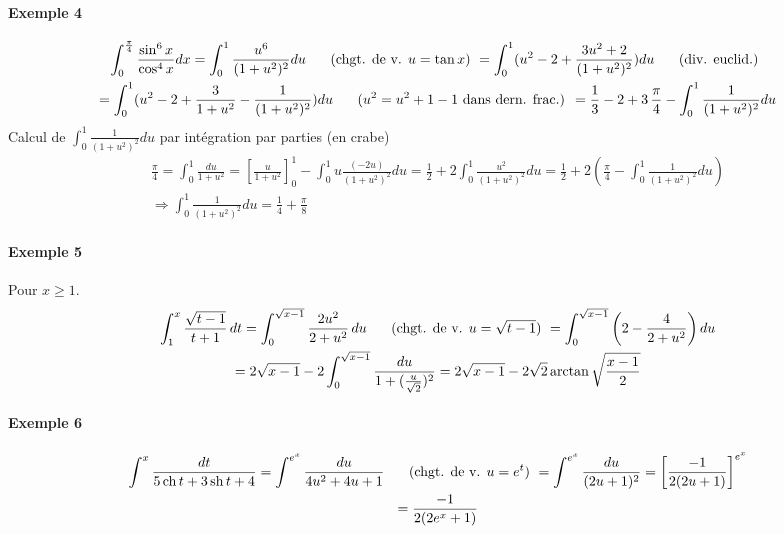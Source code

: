 \paragraph{Exemple 4}
\begin{multline*}
 \int_{0}^{\frac{\pi}{4}}\frac{\sin^6x}{\cos^4x}dx
=\int_0^1\frac{u^6}{(1+u^2)^2}du \hspace{0.5cm}\text{ (chgt. de v. $u=\tan x$) }
=\int_0^1(u^2 - 2 +\frac{3u^2+2}{(1+u^2)^2})du \hspace{0.5cm}\text{ (div. euclid.) }\\
=\int_0^1(u^2 - 2 +\frac{3}{1+u^2} - \frac{1}{(1+u^2)^2})du \hspace{0.5cm}\text{ ($u^2=u^2+1-1$ dans dern. frac.) }
=\frac{1}{3} - 2 +3\,\frac{\pi}{4}-\int_0^1\frac{1}{(1+u^2)^2}du
\end{multline*}
Calcul de $\int_0^1\frac{1}{(1+u^2)^2}du$ par intégration par parties (\og en crabe\fg)
\begin{multline*}
 \frac{\pi}{4}=\int_0^1\frac{du}{1+u^2}
=\left[ \frac{u}{1+u^2}\right]_0^1 -\int_0^1u\frac{(-2u)}{(1+u^2)^2}du
= \frac{1}{2}+2\int_0^1\frac{u^2}{(1+u^2)^2}du 
= \frac{1}{2}+2\left( \frac{\pi}{4} -\int_0^1\frac{1}{(1+u^2)^2}du\right) \\
\Rightarrow
\int_0^1\frac{1}{(1+u^2)^2}du = \frac{1}{4}+\frac{\pi}{8}
\end{multline*}

\paragraph{Exemple 5} Pour $x\geq 1$.
\begin{multline*}
\int_1^x \frac{\sqrt{t-1}}{t+1}\,dt 
= \int_0^{\sqrt{x-1}}\frac{2u^2}{2+u^2}\,du \hspace{0.5cm}\text{ (chgt. de v. $u=\sqrt{t-1}$) }
= \int_0^{\sqrt{x-1}}\left( 2-\frac{4}{2+u^2}\right) du\\
= 2\sqrt{x-1} -2\int_0^{\sqrt{x-1}}\frac{du}{1+(\frac{u}{\sqrt{2}})^2}
= 2\sqrt{x-1} -2\sqrt{2}\arctan\sqrt{\frac{x-1}{2}}
\end{multline*}


\paragraph{Exemple 6}
\begin{multline*}
 \int^x\frac{dt}{5\mathop{\mathrm{ch}} t + 3\mathop{\mathrm{sh}} t +4}
=\int^{e^x}\frac{du}{4u^2+4u+1}\hspace{0.5cm}\text{ (chgt. de v. $u=e^t$) }
=\int^{e^x}\frac{du}{(2u+1)^2}=\left[ \frac{-1}{2(2u+1)}\right]^{e^x}\\
=\frac{-1}{2(2e^x+1)} 
\end{multline*}

